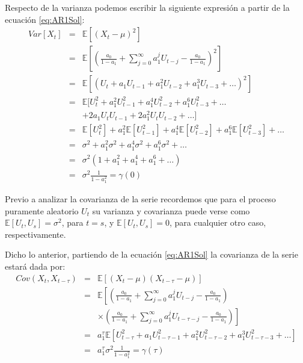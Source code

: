 \documentclass[
]{book}
\begin{document}
Respecto de la varianza podemos escribir la siguiente expresión a partir de la ecuación \eqref{eq:AR1Sol}:
\begin{eqnarray}
    Var[X_t] & = & \mathbb{E}[(X_t - \mu)^2] \nonumber \\
    & = & \mathbb{E} \left[ \left( \frac{a_0}{1 - a_1} + \sum^{\infty}_{j = 0} a_1^j U_{t-j} - \frac{a_0}{1 - a_1} \right)^2 \right] \nonumber \\
    & = & \mathbb{E}[(U_{t} + a_1 U_{t-1} + a_1^2 U_{t-2} + a_1^3 U_{t-3} + \ldots)^2] \nonumber \\
    & = & \mathbb{E}[U^2_{t} + a_1^2 U^2_{t-1} + a_1^4 U^2_{t-2} + a_1^6 U^2_{t-3} + \ldots \nonumber \\
    &   & + 2 a_1 U_t U_{t-1} + 2 a_1^2 U_t U_{t-2} + \ldots] \nonumber \\
    & = & \mathbb{E}[U^2_{t}] + a_1^2 \mathbb{E}[U^2_{t-1}] + a_1^4 \mathbb{E}[U^2_{t-2}] + a_1^6 \mathbb{E}[U^2_{t-3}] + \ldots \nonumber \\
    & = & \sigma^2 + a_1^2 \sigma^2 + a_1^4 \sigma^2 + a_1^6 \sigma^2 + \ldots \nonumber \\
    & = & \sigma^2 (1 + a_1^2 + a_1^4 + a_1^6 + \ldots) \nonumber \\
    & = & \sigma^2 \frac{1}{1 - a_1^2} = \gamma(0)
    \label{eq:AR1Var}
\end{eqnarray}

Previo a analizar la covarianza de la serie recordemos que para el proceso puramente aleatorio \(U_t\) su varianza y covarianza puede verse como \(\mathbb{E}[U_t, U_s] = \sigma^2\), para \(t = s\), y \(\mathbb{E}[U_t, U_s] = 0\), para cualquier otro caso, respectivamente.

Dicho lo anterior, partiendo de la ecuación \eqref{eq:AR1Sol} la covarianza de la serie estará dada por:
\begin{eqnarray}
    Cov(X_t, X_{t-\tau}) & = & \mathbb{E}[(X_t - \mu)(X_{t-\tau} - \mu)] \nonumber \\
    & = & \mathbb{E} \left[ \left( \frac{a_0}{1 - a_1} + \sum^{\infty}_{j = 0} a_1^j U_{t-j} - \frac{a_0}{1 - a_1} \right) \right. \nonumber \\
    &   & \left. \times \left( \frac{a_0}{1 - a_1} + \sum^{\infty}_{j = 0} a_1^j U_{t-\tau-j} - \frac{a_0}{1 - a_1} \right) \right] \nonumber \\
    & = & a_1^{\tau} \mathbb{E}[U^2_{t-\tau} + a_1 U^2_{t-\tau-1} + a_1^2 U^2_{t-\tau-2} + a_1^3 U^2_{t-\tau-3} + \ldots] \nonumber \\
    & = & a_1^{\tau} \sigma^2 \frac{1}{1 - a_1^2} = \gamma(\tau)
    \label{eq:AR1Cov}
\end{eqnarray}
\end{document}

